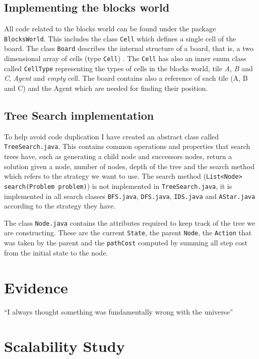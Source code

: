 \documentclass{article}
\def\code#1{\texttt{#1}}
\begin{document}
\subsection{Implementing the blocks world}

All code related to the blocks world can be found under the package \texttt{BlocksWorld}. This includes the class \texttt{Cell} which defines a single cell of the board. The class \texttt{Board} describes the internal structure of a board, that is, a two dimensional array of cells (type \texttt{Cell}) . The \texttt{Cell} has also an inner enum class called \texttt{CellType} representing the types of cells in the blocks world, tile \textit{A}, \textit{B} and \textit{C}, \textit{Agent} and \textit{empty} cell. The board contains also a reference of each tile (A, B and C) and the Agent which are needed for finding their position.

\subsection{Tree Search implementation}
To help avoid code duplication I have created an abstract class called \texttt{TreeSearch.java}. This contains common operations and properties that search trees have, such as generating a child node and successors nodes, return a solution given a node, number of nodes, depth of the tree and the search method which refers to the strategy we want to use. The search method (\code{List<Node> search(Problem problem)}) is not implemented in \texttt{TreeSearch.java}, it is implemented in all search classes \texttt{BFS.java}, \texttt{DFS.java}, \texttt{IDS.java} and \texttt{AStar.java} according to the strategy they have. 
\par
 The class \code{Node.java} contains the attributes required to keep track of the tree we are constructing. These are the current \code{State}, the parent \code{Node}, the \code{Action} that was taken by the parent and the \code{pathCost} computed by summing all step cost from the initial state to the node.
 
 
 
 
 
 
 

\section{Evidence}
``I always thought something was fundamentally wrong with the universe'' \citep{adams1995hitchhiker}


\section{Scalability Study}
\end{document}

